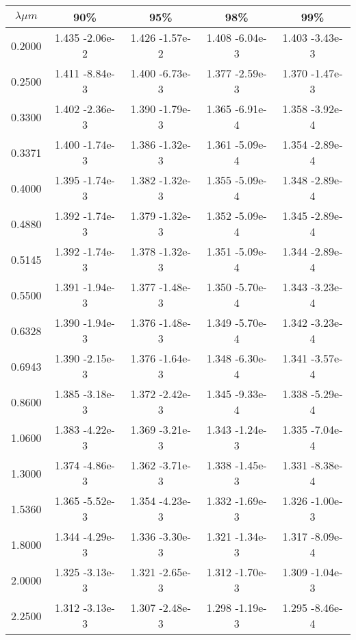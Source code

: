 \documentclass[12pt]{article}
\begin{document}
\begin{center}
\begin{table}
\begin{tabular}{| c | c | c | c | c |  }
\hline
 $\lambda \mu m$   & 90\%  & 95\%  & 98\%  & 99\% \\
\hline
0.2000  &   1.435   -2.06e-2 &   1.426   -1.57e-2  &  1.408   -6.04e-3 &   1.403   -3.43e-3  \\
0.2500  &   1.411   -8.84e-3 &   1.400   -6.73e-3  &  1.377   -2.59e-3 &   1.370   -1.47e-3  \\
0.3300  &   1.402   -2.36e-3 &   1.390   -1.79e-3  &  1.365   -6.91e-4 &   1.358   -3.92e-4  \\
0.3371  &   1.400   -1.74e-3 &   1.386   -1.32e-3  &  1.361   -5.09e-4 &   1.354   -2.89e-4  \\
0.4000  &   1.395   -1.74e-3 &   1.382   -1.32e-3  &  1.355   -5.09e-4 &   1.348   -2.89e-4  \\
0.4880  &   1.392   -1.74e-3 &   1.379   -1.32e-3  &  1.352   -5.09e-4 &   1.345   -2.89e-4  \\
0.5145  &   1.392   -1.74e-3 &   1.378   -1.32e-3   & 1.351   -5.09e-4 &   1.344   -2.89e-4  \\
0.5500   &  1.391   -1.94e-3 &   1.377   -1.48e-3  &  1.350   -5.70e-4 &   1.343   -3.23e-4  \\
0.6328  &   1.390   -1.94e-3 &   1.376   -1.48e-3  &  1.349   -5.70e-4 &   1.342   -3.23e-4  \\
0.6943  &   1.390   -2.15e-3 &   1.376   -1.64e-3  &  1.348   -6.30e-4 &   1.341   -3.57e-4  \\
0.8600  &   1.385   -3.18e-3 &   1.372   -2.42e-3  &  1.345   -9.33e-4 &   1.338   -5.29e-4  \\
1.0600  &   1.383   -4.22e-3 &   1.369   -3.21e-3  &  1.343   -1.24e-3 &   1.335   -7.04e-4  \\
1.3000   &  1.374   -4.86e-3 &   1.362   -3.71e-3  &  1.338   -1.45e-3 &   1.331   -8.38e-4  \\
1.5360   &  1.365   -5.52e-3 &   1.354   -4.23e-3  &  1.332   -1.69e-3 &   1.326   -1.00e-3  \\
1.8000  &   1.344   -4.29e-3 &   1.336   -3.30e-3  &  1.321   -1.34e-3 &   1.317   -8.09e-4  \\
2.0000  &   1.325   -3.13e-3 &   1.321   -2.65e-3  &  1.312   -1.70e-3 &   1.309   -1.04e-3  \\
2.2500  &   1.312   -3.13e-3 &   1.307   -2.48e-3  &  1.298   -1.19e-3 &   1.295   -8.46e-4  \\

\end{tabular}
\end{table}
\end{center}
\end{document}
